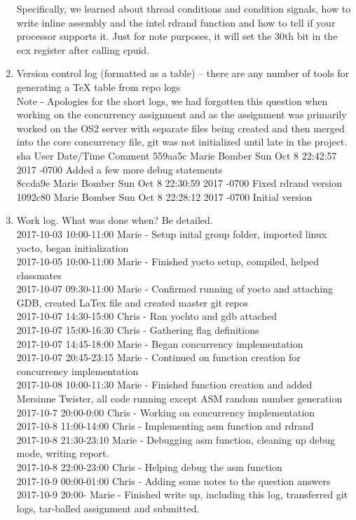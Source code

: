 \documentclass[letterpaper,10pt,titlepage]{article}
\begin{document}
\begin{enumerate}
Specifically, we learned about thread conditions and condition signals, how to write inline assembly and the intel rdrand function and how to tell if your processor supports it. Just for note purposes, it will set the 30th bit in the ecx register after calling cpuid.
\item Version control log (formatted as a table) -- there are any number of tools for generating a TeX table from repo logs\\
Note - Apologies for the short logs, we had forgotten this question when working on the concurrency assignment and as the assignment was primarily worked on the OS2 server with separate files being created and then merged into the core concurrency file, git was not initialized until late in the project.\\

sha	User		Date/Time			Comment
559aa5c Marie Bomber     Sun Oct 8 22:42:57 2017 -0700   Added a few more debug statements\\
8ccda9e Marie Bomber     Sun Oct 8 22:30:59 2017 -0700   Fixed rdrand version\\
1092c80 Marie Bomber     Sun Oct 8 22:28:12 2017 -0700   Initial version\\

\item Work log. What was done when? Be detailed.\\
2017-10-03 10:00-11:00 Marie - Setup inital group folder, imported linux yocto, began initialization\\
2017-10-05 10:00-11:00 Marie - Finished yocto setup, compiled, helped classmates\\
2017-10-07 09:30-11:00 Marie - Confirmed running of yocto and attaching GDB, created LaTex file and created master git repos\\
2017-10-07 14:30-15:00 Chris - Ran yochto and gdb attached\\
2017-10-07 15:00-16:30 Chris - Gathering flag definitions\\
2017-10-07 14:45-18:00 Marie - Began concurrency implementation\\
2017-10-07 20:45-23:15 Marie - Continued on function creation for concurrency implementation\\
2017-10-08 10:00-11:30 Marie - Finished function creation and added Mersinne Twister, all code running except ASM random number generation\\
2017-10-7 20:00-0:00 Chris - Working on concurrency implementation\\
2017-10-8 11:00-14:00 Chris - Implementing asm function and rdrand\\
2017-10-8 21:30-23:10 Marie - Debugging asm function, cleaning up debug mode, writing report.\\
2017-10-8 22:00-23:00 Chris - Helping debug the asm function\\
2017-10-9 00:00-01:00 Chris - Adding some notes to the question answers\\
2017-10-9 20:00-      Marie - Finished write up, including this log, transferred git logs, tar-balled assignment and submitted.\\

\end{enumerate}
\end{document}
